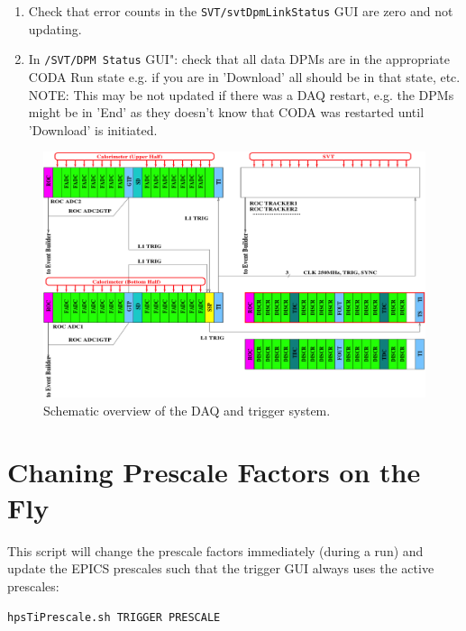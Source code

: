 \documentclass[12pt]{article}
\begin{document}
\begin{enumerate}
\begin{enumerate}
\item
Check that error counts in the \texttt{SVT/svtDpmLinkStatus} GUI are zero and not updating.

\item
In \texttt{/SVT/DPM Status} GUI": check that all data DPMs are in the appropriate CODA Run state e.g. if you are in 'Download' all should be in that state, etc. 
\newline NOTE: This may be not updated if there was a DAQ restart, e.g. the DPMs might be in 'End' as they doesn't know that CODA was restarted until 'Download' is initiated.
\end{enumerate}
\end{enumerate}




\begin{figure}[htbp]
\begin{center}
    \includegraphics[width=\textwidth]{daq.png}
\caption{Schematic overview of the DAQ and trigger system.}
\label{fig:daq}
\end{center}
\end{figure}

\newpage

\appendix
\section{Chaning Prescale Factors on the Fly}
This script will change the prescale factors immediately (during a run) and update the EPICS prescales
such that the trigger GUI always uses the active prescales:\newline
\centerline{\texttt{hpsTiPrescale.sh TRIGGER PRESCALE}}
\end{document}
